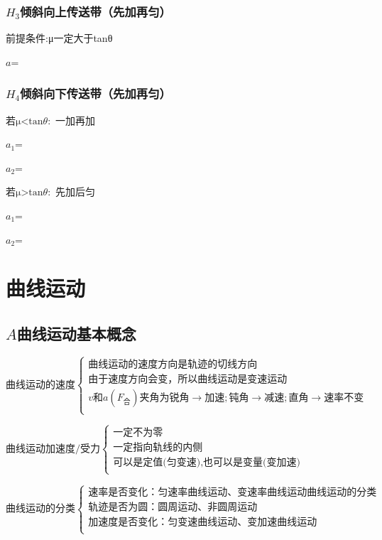 \documentclass[lang=cn,10pt]{elegantbook}
\begin{document}
         \subsection{$H_{3}$倾斜向上传送带（先加再匀）}
         前提条件:μ一定大于tanθ
         
         $a$=
         
         \subsection{$H_{4}$倾斜向下传送带（先加再匀）}
         $\text{若μ<tan}\theta:\text{ 一加再加}$
         
         $a_1$=
         
         $a_2$=
         
         $\text{若μ>tan}\theta:\text{ 先加后匀}$
         
          $a_1$=
         
         $a_2$=
         \chapter{曲线运动}
         \section{$A$曲线运动基本概念}
        $\text{曲线运动的速度}\begin{cases}
        	\text{曲线运动的速度方向是轨迹的切线方向}\\
        	\text{由于速度方向会变，所以曲线运动是变速运动}\\
        	v\text{和}a(F_{\text{合}})\text{夹角为锐角}\rightarrow \text{加速};\text{钝角}\rightarrow \text{减速};\text{直角}\rightarrow \text{速率不变}\\
        \end{cases}$
        
        $\text{曲线运动加速度}/\text{受力}\begin{cases}
        	\text{一定不为零}\\
        	\text{一定指向轨线的内侧}\\
        	\text{可以是定值(匀变速)},\text{也可以是变量(变加速)}\\
        \end{cases}$
        
        $\text{曲线运动的分类}\left\{ \begin{array}{l}
        	\text{速率是否变化：匀速率曲线运动、变速率曲线运动曲线运动的分类}\\
        	\text{轨迹是否为圆：圆周运动、非圆周运动}\\
        	\text{加速度是否变化：匀变速曲线运动、变加速曲线运动}\\
        \end{array} \right. 
        $
        
\end{document}
